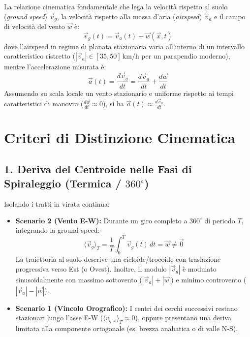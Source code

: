 \documentclass[11pt,a4paper]{article}
\begin{document}
La relazione cinematica fondamentale che lega la velocit\`a rispetto al suolo (\textit{ground speed}) $\vec{v}_g$, la velocit\`a rispetto alla massa d'aria (\textit{airspeed}) $\vec{v}_a$ e il campo di velocit\`a del vento $\vec{w}$ \`e:
\begin{equation}
    \vec{v}_g(t) = \vec{v}_a(t) + \vec{w}(\vec{x}, t)
\end{equation}
dove l'airspeed in regime di planata stazionaria varia all'interno di un intervallo caratteristico ristretto ($|\vec{v}_a| \in [35, 50]\,\mathrm{km/h}$ per un parapendio moderno), mentre l'accelerazione misurata \`e:
\begin{equation}
    \vec{a}(t) = \frac{d\vec{v}_g}{dt} = \frac{d\vec{v}_a}{dt} + \frac{d\vec{w}}{dt}
\end{equation}
Assumendo su scala locale un vento stazionario e uniforme rispetto ai tempi caratteristici di manovra ($\frac{d\vec{w}}{dt} \approx 0$), si ha $\vec{a}(t) \approx \frac{d\vec{v}_a}{dt}$.

\section{Criteri di Distinzione Cinematica}

\subsection{1. Deriva del Centroide nelle Fasi di Spiraleggio (Termica / $360^\circ$)}
Isolando i tratti in virata continua:
\begin{itemize}
    \item \textbf{Scenario 2 (Vento E-W):} Durante un giro completo a $360^\circ$ di periodo $T$, integrando la ground speed:
    \begin{equation}
        \langle \vec{v}_g \rangle_T = \frac{1}{T}\int_0^T \vec{v}_g(t)\,dt = \vec{w} \neq \vec{0}
    \end{equation}
    La traiettoria al suolo descrive una cicloide/trocoide con traslazione progressiva verso Est (o Ovest). Inoltre, il modulo $|\vec{v}_g|$ \`e modulato sinusoidalmente con massimo sottovento ($|\vec{v}_a| + |\vec{w}|$) e minimo controvento ($|\vec{v}_a| - |\vec{w}|$).
    \item \textbf{Scenario 1 (Vincolo Orografico):} I centri dei cerchi successivi restano stazionari lungo l'asse E-W ($\langle v_{g,x} \rangle_T \approx 0$), oppure presentano una deriva limitata alla componente ortogonale (es. brezza anabatica o di valle N-S).
\end{itemize}
\end{document}
